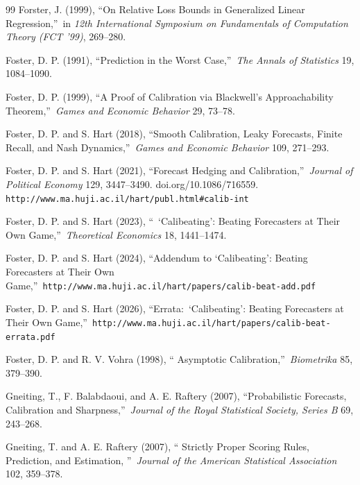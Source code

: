\documentclass[12pt,a4paper,notitlepage]{article}
\begin{document}
\begin{thebibliography}{99}
\bibitem{} Forster, J. (1999), \textquotedblleft On Relative Loss Bounds in
Generalized Linear Regression,\textquotedblright\ in \emph{12th
International Symposium on Fundamentals of Computation Theory (FCT '99)},
269--280.

\bibitem{} Foster, D. P. (1991), \textquotedblleft Prediction in the Worst
Case,\textquotedblright\ \emph{The Annals of Statistics} 19, 1084--1090.

\bibitem{} Foster, D. P. (1999), \textquotedblleft A Proof of Calibration
via Blackwell's Approachability Theorem,\textquotedblright\ \emph{Games and
Economic Behavior }29, 73--78.

\bibitem{} Foster, D. P. and S. Hart (2018), \textquotedblleft Smooth
Calibration, Leaky Forecasts, Finite Recall, and Nash
Dynamics,\textquotedblright\ \emph{Games and Economic Behavior }109,
271--293.

\bibitem{} Foster, D. P. and S. Hart (2021), \textquotedblleft Forecast
Hedging and Calibration,\textquotedblright\ \emph{Journal of Political
Economy} 129, 3447--3490. doi.org/10.1086/716559. \texttt{%
http://www.ma.huji.ac.il/hart/publ.html\#calib-int}

\bibitem{} Foster, D. P. and S. Hart (2023), \textquotedblleft\
`Calibeating': Beating Forecasters at Their Own Game,\textquotedblright\ 
\emph{Theoretical Economics }18, 1441--1474.

\bibitem{} Foster, D. P. and S. Hart (2024), \textquotedblleft Addendum
to `Calibeating': Beating Forecasters at Their Own Game,\textquotedblright\ 
\texttt{http://www.ma.huji.ac.il/hart/papers/calib-beat-add.pdf}

\bibitem{} Foster, D. P. and S. Hart (2026), \textquotedblleft Errata:\
`Calibeating': Beating Forecasters at Their Own Game,\textquotedblright\ 
\texttt{http://www.ma.huji.ac.il/hart/papers/calib-beat-errata.pdf}

\bibitem{} Foster, D. P. and R. V. Vohra (1998), \textquotedblleft
Asymptotic Calibration,\textquotedblright\ \emph{Biometrika} 85, 379--390.

\bibitem{} Gneiting, T., F. Balabdaoui, and A. E. Raftery (2007),
\textquotedblleft Probabilistic Forecasts, Calibration and
Sharpness,\textquotedblright\ \emph{Journal of the Royal Statistical
Society, Series B} 69, 243--268.

\bibitem{} Gneiting, T. and A. E. Raftery (2007), \textquotedblleft
Strictly Proper Scoring Rules, Prediction, and Estimation,
\textquotedblright\ \emph{Journal of the American Statistical
Association} 102, 359--378.


\end{thebibliography}
\end{document}
